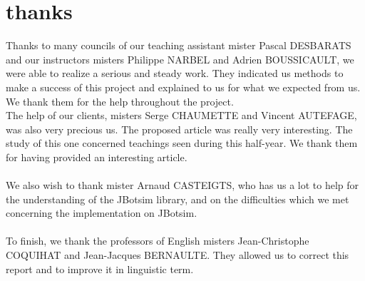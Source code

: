 \chapter*{thanks}

Thanks to many councils of our teaching assistant mister Pascal DESBARATS and our instructors misters Philippe NARBEL and Adrien BOUSSICAULT, we were able to realize a serious and steady work. They indicated us methods to make a success of this project and explained to us for what we expected from us. We thank them for the help throughout the project.\\

The help of our clients, misters Serge CHAUMETTE and Vincent AUTEFAGE, was also very precious us. The proposed article was really very interesting. The study of this one concerned teachings seen during this half-year. We thank them for having provided an interesting article.\\\\

We also wish to thank mister Arnaud CASTEIGTS, who has us a lot to help for the understanding of the JBotsim library, and on the difficulties which we met concerning the implementation on JBotsim.\\\\

To finish, we thank the professors of English misters Jean-Christophe COQUIHAT and Jean-Jacques BERNAULTE. They allowed us to correct this report and to improve it in linguistic term.